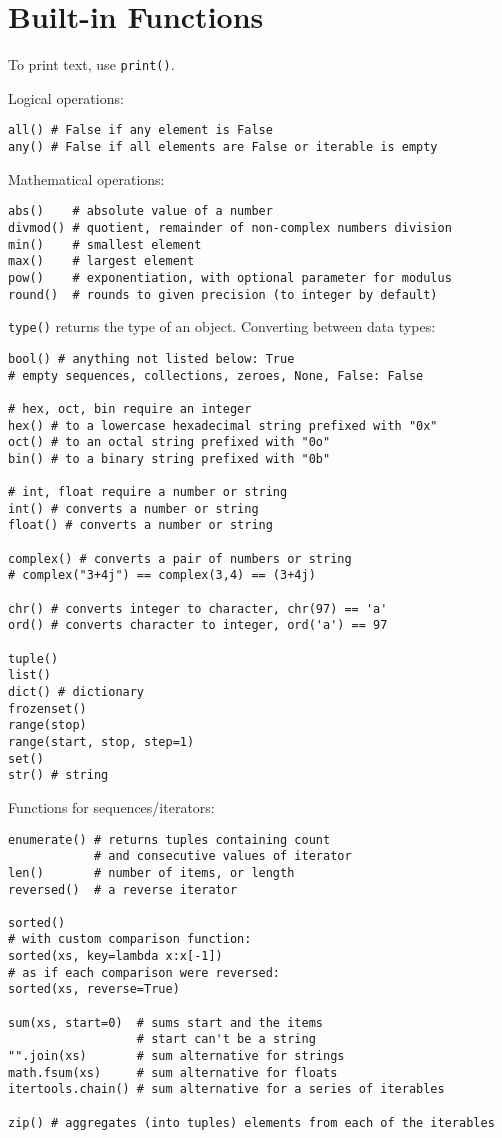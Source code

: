 \section{Built-in Functions}
To print text, use \texttt{print()}.

Logical operations:
\begin{verbatim}
all() # False if any element is False
any() # False if all elements are False or iterable is empty
\end{verbatim}

Mathematical operations:
\begin{verbatim}
abs()    # absolute value of a number
divmod() # quotient, remainder of non-complex numbers division
min()    # smallest element
max()    # largest element
pow()    # exponentiation, with optional parameter for modulus
round()  # rounds to given precision (to integer by default)
\end{verbatim}

\texttt{type()} returns the type of an object.
Converting between data types:
\begin{verbatim}
bool() # anything not listed below: True
# empty sequences, collections, zeroes, None, False: False

# hex, oct, bin require an integer
hex() # to a lowercase hexadecimal string prefixed with "0x"
oct() # to an octal string prefixed with "0o"
bin() # to a binary string prefixed with "0b"
       
# int, float require a number or string
int() # converts a number or string
float() # converts a number or string

complex() # converts a pair of numbers or string
# complex("3+4j") == complex(3,4) == (3+4j)

chr() # converts integer to character, chr(97) == 'a'
ord() # converts character to integer, ord('a') == 97

tuple()
list()
dict() # dictionary
frozenset()
range(stop)
range(start, stop, step=1)
set()
str() # string
\end{verbatim}

Functions for sequences/iterators:
\begin{verbatim}
enumerate() # returns tuples containing count
            # and consecutive values of iterator
len()       # number of items, or length
reversed()  # a reverse iterator

sorted()
# with custom comparison function:
sorted(xs, key=lambda x:x[-1])
# as if each comparison were reversed:
sorted(xs, reverse=True)

sum(xs, start=0)  # sums start and the items
                  # start can't be a string
"".join(xs)       # sum alternative for strings
math.fsum(xs)     # sum alternative for floats
itertools.chain() # sum alternative for a series of iterables

zip() # aggregates (into tuples) elements from each of the iterables
\end{verbatim}

